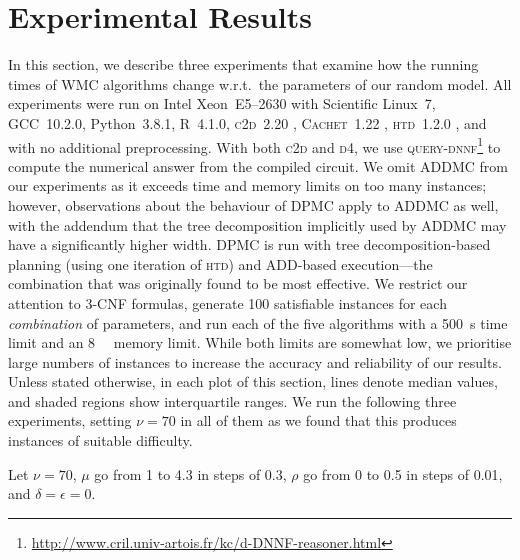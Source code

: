 
\section{Experimental Results}\label{sec:experiments}

In this section, we describe three experiments that examine how the running
times of WMC algorithms change w.r.t.\ the parameters of our random model. All
experiments were run on Intel Xeon~E5--2630 with Scientific Linux~7, GCC~10.2.0,
Python~3.8.1, R~4.1.0, \textsc{c2d}~2.20 \citep{DBLP:conf/ecai/Darwiche04},
\textsc{Cachet}~1.22 \citep{DBLP:conf/sat/SangBBKP04}, \textsc{htd}~1.2.0
\citep{DBLP:conf/cpaior/AbseherMW17}, and with no additional preprocessing. With
both \textsc{c2d} and \textsc{d4}, we use
\textsc{query-dnnf}\footnote{\url{http://www.cril.univ-artois.fr/kc/d-DNNF-reasoner.html}}
to compute the numerical answer from the compiled circuit. We omit
\textsc{ADDMC} \citep{DBLP:conf/aaai/DudekPV20} from our experiments as it
exceeds time and memory limits on too many instances; however, observations
about the behaviour of \textsc{DPMC} \citep{DBLP:conf/cp/DudekPV20} apply to
\textsc{ADDMC} as well, with the addendum that the tree decomposition implicitly
used by \textsc{ADDMC} may have a significantly higher width. \textsc{DPMC} is
run with tree decomposition-based planning (using one iteration of \textsc{htd})
and ADD-based execution---the combination that was originally found to be most
effective. We restrict our attention to 3-CNF formulas, generate 100 satisfiable
instances for each \emph{combination} of parameters, and run each of the five
algorithms with a \SI{500}{\second} time limit and an \SI{8}{\gibi\byte} memory
limit. While both limits are somewhat low, we prioritise large numbers of
instances to increase the accuracy and reliability of our results. Unless stated
otherwise, in each plot of this section, lines denote median values, and shaded
regions show interquartile ranges. We run the following three experiments,
setting $\nu = 70$ in all of them as we found that this produces instances of
suitable difficulty.

\begin{experiment}\label{exp:density}
  Let $\nu = 70$, $\mu$ go from 1 to 4.3 in steps of 0.3, $\rho$ go from 0 to
  0.5 in steps of 0.01, and $\delta = \epsilon = 0$.
\end{experiment}

